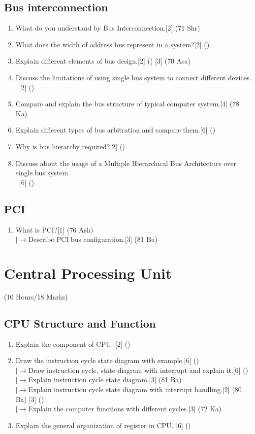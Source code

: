 \documentclass[12pt]{article}
\newcommand{\lb}{\\$\left|\rightarrow\right.$}
\newcommand{\enter}{\\\textcolor{white}{1}}
\begin{document}
	\subsection{Bus interconnection}
	\begin{enumerate}[noitemsep, topsep = 0pt]
	\item What do you understand by Bus Interconnection.\hfill[2] (71 Shr)
	\item What does the width of address bus represent in a system?\hfill[2] ()
	\item Explain different elements of bus design.\hfill[2] () [3] (70 Asa)
	\item Discuss the limitations of using single bus system to connect different devices.
	\enter\hfill[2] ()
	\item Compare and explain the bus structure of typical computer system.\hfill[4] (78 Ka)
	\item Explain different types of bus arbitration and compare them.\hfill[6] ()
	\item Why is bus hierarchy required?\hfill[2] ()
	\item Discuss about the usage of a Multiple Hierarchical Bus Architecture over single bus system.
	\enter\hfill[6] ()
	\end{enumerate}
	\subsection{PCI}
	\begin{enumerate}[noitemsep, topsep = 0pt]
	\item What is PCI?\hfill[1] (76 Ash)
	\lb Describe PCI bus configuration.\hfill[3] (81 Ba)
	\end{enumerate}

	\pagebreak
\section{Central Processing Unit}
	\begin{center}(10 Hours/18 Marks)\end{center}
	\subsection{CPU Structure and Function}
	\begin{enumerate}[noitemsep, topsep = 0pt]
		\item Explain the component of CPU. \hfill [2] ()
	\item Draw the instruction cycle state diagram with example.\hfill[6] ()
	\lb Draw instruction cycle, state diagram with interrupt and explain it.\hfill[6] ()
	\lb Explain instruction cycle state diagram.\hfill[3] (81 Ba)
	\lb Explain instruction cycle state diagram with interrupt handling.\hfill[2] (80 Ba) [3] ()
	\lb Explain the computer functions with different cycles.\hfill[3] (72 Ka)

		\item Explain the general organization of register in CPU. \hfill [6] ()
	\end{enumerate}
\end{document}
